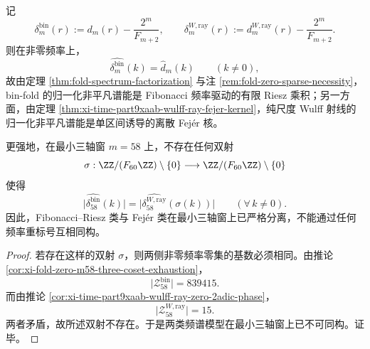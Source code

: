 \begin{theorem}\label{thm:xi-time-part9xaab-binfold-fejer-riesz-nonisomorphism}
记
\[
\delta_m^{\mathrm{bin}}(r):=d_m(r)-\frac{2^m}{F_{m+2}},
\qquad
\delta_m^{W,\mathrm{ray}}(r):=d_m^{W,\mathrm{ray}}(r)-\frac{2^m}{F_{m+2}}.
\]
则在非零频率上，
\[
\widehat{\delta_m^{\mathrm{bin}}}(k)=\widehat d_m(k)
\qquad (k\neq 0),
\]
故由定理 \ref{thm:fold-spectrum-factorization} 与注 \ref{rem:fold-zero-sparse-necessity}，bin-fold 的归一化非平凡谱能是 Fibonacci 频率驱动的有限 Riesz 乘积；另一方面，由定理 \ref{thm:xi-time-part9xaab-wulff-ray-fejer-kernel}，纯尺度 Wulff 射线的归一化非平凡谱能是单区间诱导的离散 Fej\'er 核。

更强地，在最小三轴窗 \(m=58\) 上，不存在任何双射
\[
\sigma:\ZZ/(F_{60}\ZZ)\setminus\{0\}\longrightarrow \ZZ/(F_{60}\ZZ)\setminus\{0\}
\]
使得
\[
\bigl|\widehat{\delta_{58}^{\mathrm{bin}}}(k)\bigr|
=
\bigl|\widehat{\delta_{58}^{W,\mathrm{ray}}}(\sigma(k))\bigr|
\qquad(\forall\,k\neq 0).
\]
因此，Fibonacci--Riesz 类与 Fej\'er 类在最小三轴窗上已严格分离，不能通过任何频率重标号互相同构。
\end{theorem}
\begin{proof}
若存在这样的双射 \(\sigma\)，则两侧非零频率零集的基数必须相同。由推论 \ref{cor:xi-fold-zero-m58-three-coset-exhaustion}，
\[
\bigl|\mathcal Z_{58}^{\mathrm{bin}}\bigr|=839415.
\]
而由推论 \ref{cor:xi-time-part9xaab-wulff-ray-zero-2adic-phase}，
\[
\bigl|\mathcal Z_{58}^{W,\mathrm{ray}}\bigr|=15.
\]
两者矛盾，故所述双射不存在。于是两类频谱模型在最小三轴窗上已不可同构。证毕。
\end{proof}

